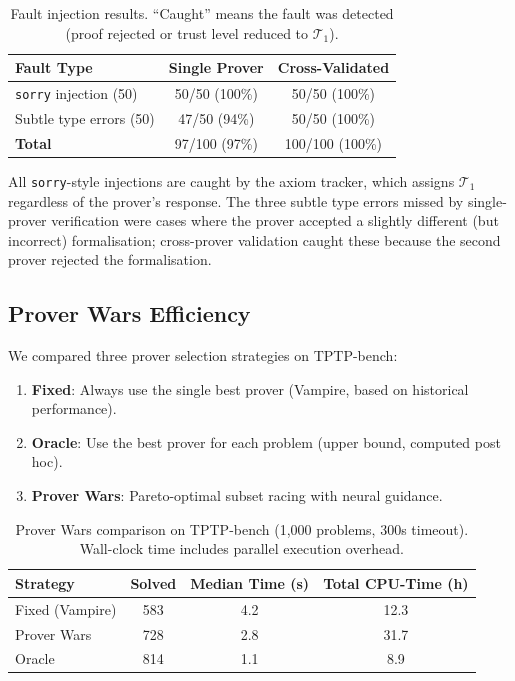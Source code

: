 \documentclass[11pt,a4paper]{article}
\newcommand{\trustlevel}[1]{\ensuremath{\mathcal{T}_{#1}}}
\begin{document}
\begin{table}[htbp]
\centering
\caption{Fault injection results. ``Caught'' means the fault was detected
(proof rejected or trust level reduced to $\trustlevel{1}$).}
\label{tab:fault-injection}
\begin{tabular}{@{}lcc@{}}
\toprule
\textbf{Fault Type} & \textbf{Single Prover} & \textbf{Cross-Validated} \\
\midrule
\texttt{sorry} injection (50)     & 50/50 (100\%) & 50/50 (100\%) \\
Subtle type errors (50)           & 47/50 (94\%)  & 50/50 (100\%) \\
\midrule
\textbf{Total}                     & 97/100 (97\%) & 100/100 (100\%) \\
\bottomrule
\end{tabular}
\end{table}

All \texttt{sorry}-style injections are caught by the axiom tracker, which
assigns $\trustlevel{1}$ regardless of the prover's response. The three
subtle type errors missed by single-prover verification were cases where the
prover accepted a slightly different (but incorrect) formalisation; cross-prover
validation caught these because the second prover rejected the formalisation.

\subsection{Prover Wars Efficiency}

We compared three prover selection strategies on TPTP-bench:

\begin{enumerate}
  \item \textbf{Fixed}: Always use the single best prover (Vampire, based on
  historical performance).
  \item \textbf{Oracle}: Use the best prover for each problem (upper bound,
  computed post hoc).
  \item \textbf{Prover Wars}: Pareto-optimal subset racing with neural
  guidance.
\end{enumerate}

\begin{table}[htbp]
\centering
\caption{Prover Wars comparison on TPTP-bench (1,000 problems, 300s timeout).
Wall-clock time includes parallel execution overhead.}
\label{tab:prover-wars}
\begin{tabular}{@{}lccc@{}}
\toprule
\textbf{Strategy} & \textbf{Solved} & \textbf{Median Time (s)} & \textbf{Total CPU-Time (h)} \\
\midrule
Fixed (Vampire)   & 583 & 4.2 & 12.3 \\
Prover Wars       & 728 & 2.8 & 31.7 \\
Oracle            & 814 & 1.1 & 8.9  \\
\bottomrule
\end{tabular}
\end{table}
\end{document}
